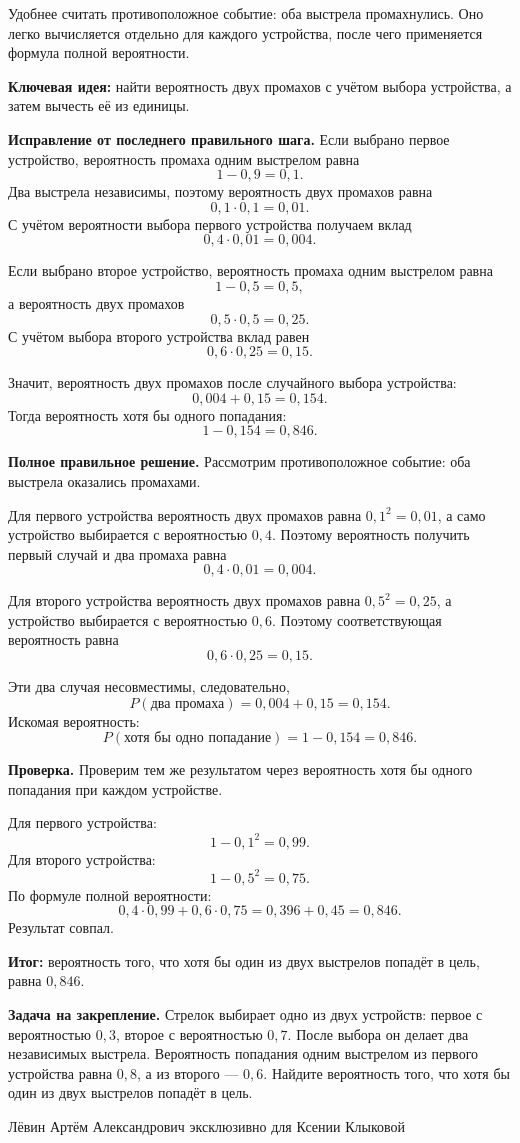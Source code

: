 \documentclass[12pt,a4paper]{article}
\begin{document}
Удобнее считать противоположное событие: оба выстрела промахнулись. Оно легко вычисляется отдельно для каждого устройства, после чего применяется формула полной вероятности.

\textcolor{blue!60!black}{\textbf{Ключевая идея:}} найти вероятность двух промахов с учётом выбора устройства, а затем вычесть её из единицы.

\textbf{Исправление от последнего правильного шага.}
Если выбрано первое устройство, вероятность промаха одним выстрелом равна
\[
1-0{,}9=0{,}1.
\]
Два выстрела независимы, поэтому вероятность двух промахов равна
\[
0{,}1\cdot0{,}1=0{,}01.
\]
С учётом вероятности выбора первого устройства получаем вклад
\[
0{,}4\cdot0{,}01=0{,}004.
\]

Если выбрано второе устройство, вероятность промаха одним выстрелом равна
\[
1-0{,}5=0{,}5,
\]
а вероятность двух промахов
\[
0{,}5\cdot0{,}5=0{,}25.
\]
С учётом выбора второго устройства вклад равен
\[
0{,}6\cdot0{,}25=0{,}15.
\]

Значит, вероятность двух промахов после случайного выбора устройства:
\[
0{,}004+0{,}15=0{,}154.
\]
Тогда вероятность хотя бы одного попадания:
\[
1-0{,}154=0{,}846.
\]

\textbf{Полное правильное решение.}
Рассмотрим противоположное событие: оба выстрела оказались промахами.

Для первого устройства вероятность двух промахов равна $0{,}1^2=0{,}01$, а само устройство выбирается с вероятностью $0{,}4$. Поэтому вероятность получить первый случай и два промаха равна
\[
0{,}4\cdot0{,}01=0{,}004.
\]

Для второго устройства вероятность двух промахов равна $0{,}5^2=0{,}25$, а устройство выбирается с вероятностью $0{,}6$. Поэтому соответствующая вероятность равна
\[
0{,}6\cdot0{,}25=0{,}15.
\]

Эти два случая несовместимы, следовательно,
\[
P(\text{два промаха})=0{,}004+0{,}15=0{,}154.
\]
Искомая вероятность:
\[
P(\text{хотя бы одно попадание})=1-0{,}154=0{,}846.
\]

\textbf{Проверка.}
Проверим тем же результатом через вероятность хотя бы одного попадания при каждом устройстве.

Для первого устройства:
\[
1-0{,}1^2=0{,}99.
\]
Для второго устройства:
\[
1-0{,}5^2=0{,}75.
\]
По формуле полной вероятности:
\[
0{,}4\cdot0{,}99+0{,}6\cdot0{,}75=0{,}396+0{,}45=0{,}846.
\]
Результат совпал.

\textcolor{teal!60!black}{\textbf{Итог:}} вероятность того, что хотя бы один из двух выстрелов попадёт в цель, равна $0{,}846$.

\textbf{Задача на закрепление.}
Стрелок выбирает одно из двух устройств: первое с вероятностью $0{,}3$, второе с вероятностью $0{,}7$. После выбора он делает два независимых выстрела. Вероятность попадания одним выстрелом из первого устройства равна $0{,}8$, а из второго --- $0{,}6$. Найдите вероятность того, что хотя бы один из двух выстрелов попадёт в цель.

\vfill
\begin{center}
\small Лёвин Артём Александрович эксклюзивно для Ксении Клыковой
\end{center}
\end{document}
